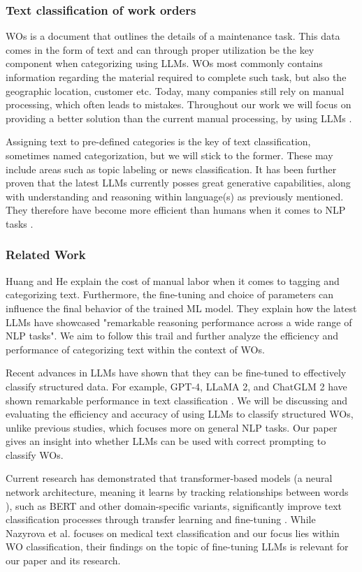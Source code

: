 \subsubsection{Text classification of work orders}

WOs is a document that outlines the details of a maintenance task.
This data comes in the form of text and can through proper utilization be the
key component when categorizing using LLMs.
WOs most commonly contains information regarding the material required to
complete such task, but also the geographic location, customer etc.
Today, many companies still rely on manual processing, which often leads to
mistakes.
Throughout our work we will focus on providing a better solution than the
current manual processing, by using LLMs \cite{ibm2023} \cite{li2024}.

Assigning text to pre-defined categories is the key of text classification,
sometimes named categorization, but we will stick to the former.
These may include areas such as topic labeling or news classification.
It has been further proven that the latest LLMs currently posses great
generative capabilities, along with understanding and reasoning within
language(s) as previously mentioned.
They therefore have become more efficient than humans when it comes to NLP tasks
\cite{zhang2024}.

\subsubsection{Related Work}

Huang and He \cite{huang2024} explain the cost of manual labor when it comes to
tagging and categorizing text.
Furthermore, the fine-tuning and choice of parameters can influence the final
behavior of the trained ML model.
They explain how the latest LLMs have showcased "remarkable reasoning
performance across a wide range of NLP tasks".
We aim to follow this trail and further analyze the efficiency and performance
of categorizing text within the context of WOs.

\bigskip
Recent advances in LLMs have shown that they can be fine-tuned to effectively
classify structured data.
For example, GPT-4, LLaMA 2, and ChatGLM 2 have shown remarkable performance in
text classification \cite{zhang2024}.
We will be discussing and evaluating the efficiency and accuracy of using LLMs
to classify structured WOs, unlike previous studies, which focuses more on
general NLP tasks.
Our paper gives an insight into whether LLMs can be used with correct prompting
to classify WOs.

\bigskip
Current research has demonstrated that transformer-based models
(a neural network architecture, meaning it learns by tracking relationships
between words \cite{merritt2022}),
such as BERT and other domain-specific variants, significantly improve text
classification processes through transfer learning and fine-tuning
\cite{nazyrova2024}.
While Nazyrova et al. focuses on medical text classification and our focus lies
within WO classification, their findings on the topic of fine-tuning LLMs is
relevant for our paper and its research.
